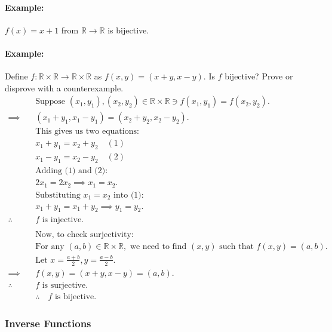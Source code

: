 \paragraph*{Example:} $f(x) = x + 1$ from $\mathbb{R} \to \mathbb{R}$ is bijective.

\paragraph*{Example:} Define $f: \mathbb{R} \times \mathbb{R} \to \mathbb{R} \times \mathbb{R}$ as $f(x, y) = (x + y, x - y)$. Is $f$ bijective? Prove or disprove with a counterexample.\\
\begin{align*}
    &\text{Suppose } (x_1, y_1), (x_2, y_2) \in \mathbb{R} \times \mathbb{R} \ni f(x_1, y_1) = f(x_2, y_2).\\
    \implies \quad & (x_1 + y_1, x_1 - y_1) = (x_2 + y_2, x_2 - y_2).\\
    &\text{This gives us two equations:}\\
    & x_1 + y_1 = x_2 + y_2 \quad (1)\\
    & x_1 - y_1 = x_2 - y_2 \quad (2)\\
    &\text{Adding (1) and (2):}\\
    & 2x_1 = 2x_2 \implies x_1 = x_2.\\
    &\text{Substituting } x_1 = x_2 \text{ into (1):}\\
    & x_1 + y_1 = x_1 + y_2 \implies y_1 = y_2.\\
    \therefore \quad & f \text{ is injective.}\\
    \\
    &\text{Now, to check surjectivity:}\\
    &\text{For any } (a, b) \in \mathbb{R} \times \mathbb{R}, \text{ we need to find } (x, y) \text{ such that } f(x, y) = (a, b).\\
    &\text{Let } x = \frac{a + b}{2}, y = \frac{a - b}{2}.\\
    \implies \quad & f(x, y) = (x + y, x - y) = (a, b).\\
    \therefore \quad & f \text{ is surjective.}\\
    &\therefore \quad f \text{ is bijective.}
\end{align*}

\subsubsection*{Inverse Functions}


